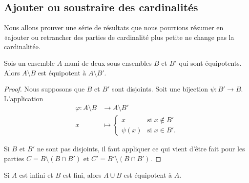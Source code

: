 \subsection{Ajouter ou soustraire des cardinalités}

Nous allons prouver une série de résultats que nous pourrions résumer en  «ajouter ou retrancher des parties de cardinalité plus petite ne change pas la cardinalité».

\begin{lemma}        \label{LEMooDHWSooFqhano}
    Sois un ensemble \( A\) muni de deux sous-ensembles \( B\) et \( B'\) qui sont équipotents. Alors \( A\setminus B\) est équipotent à \( A\setminus B'\).
\end{lemma}

\begin{proof}
    Nous supposons que \( B\) et \( B'\) sont disjoints. Soit une bijection \( \psi\colon B'\to B\). L'application
    \begin{equation}
        \begin{aligned}
            \varphi\colon A\setminus B&\to A\setminus B' \\
            x&\mapsto \begin{cases}
                x    &   \text{si } x\notin B'\\
                \psi(x)    &    \text{si } x\in B'.
            \end{cases}
        \end{aligned}
    \end{equation}

    Si \( B\) et \( B'\) ne sont pas disjoints, il faut appliquer ce qui vient d'être fait pour les parties \( C=B\setminus(B\cap B')\) et \( C'=B'\setminus (B\cap B')\).
\end{proof}

\begin{lemma}        \label{LEMooUFCAooSyZtZj}
    Si \( A\) est infini et \( B\) est fini, alors \( A\cup B\) est équipotent à \( A\).
\end{lemma}

